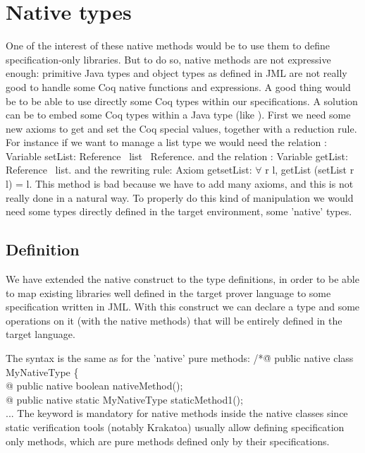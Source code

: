 \section{Native types}
One of the interest of these native methods would be to use them to define  
specification-only libraries. But to do so, native methods are not expressive 
enough: primitive Java types and object types as defined in JML are not 
really good to handle some Coq native functions and expressions.
A good thing would be to be able to use directly some Coq types within our 
specifications.
A solution can be to embed some Coq types within a Java type 
(like ).
First we need some new axioms to get and set the Coq special values, together with a reduction rule. 
For instance if we want to manage a list type
we would need the relation :
\btab
Variable setList: Reference \rarrow \ list \rarrow \ Reference.
\etab
and the relation :
\btab
Variable getList:  Reference \rarrow \ list.
\etab
and the rewriting rule:
\btab
Axiom getsetList: $\forall$ r l, getList (setList r l) = l.
\etab 
This method is bad because we have to add many axioms, and this is not really 
done in a natural way.
To properly do this kind of manipulation we would need some types directly defined 
in the target environment,  some 'native' types.

\subsection{Definition}
We have extended the native construct to the type definitions, in order to be able to map
existing libraries well defined in the target prover language to some specification written in
JML. With this construct we can declare a type and some operations on it (with the native methods)
that will be entirely defined in the target language.

The syntax is the same as for the 'native' pure methods:
\btab
/*\=@ pub\=lic native class MyNativeType \{\+\\
   @ \> public native boolean nativeMethod();\\
   @ \> public native static MyNativeType staticMethod1();\\
   ...
\etab
The  keyword is mandatory for native methods inside the native classes 
since static verification tools (notably Krakatoa) usually allow defining specification only 
methods, which are pure methods defined only by their specifications.

